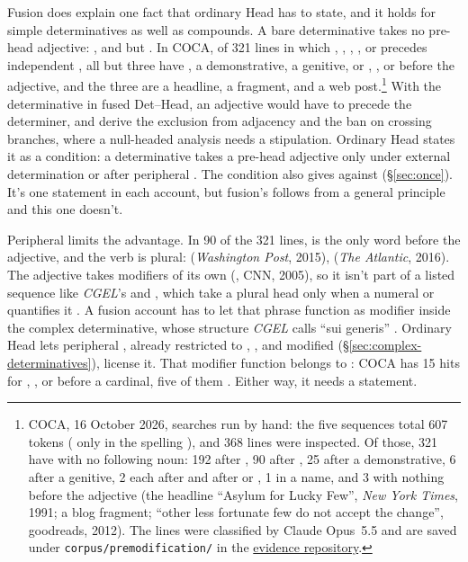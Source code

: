 \documentclass[12pt]{article}
\begin{document}
Fusion does explain one fact that ordinary Head has to state, and it holds for simple determinatives as well as compounds. A bare determinative takes no pre-head adjective: , and  but . In COCA, of 321 lines in which , , , , or  precedes independent , all but three have , a demonstrative, a genitive,  or , , or  before the adjective, and the three are a headline, a fragment, and a web post.\footnote{COCA, 16 October 2026, searches run by hand: the five sequences total 607 tokens ( only in the spelling ), and 368 lines were inspected. Of those, 321 have  with no following noun: 192 after , 90 after , 25 after a demonstrative, 6 after a genitive, 2 each after  and after  or , 1 in a name, and 3 with nothing before the adjective (the headline \enquote{Asylum for Lucky Few}, \textit{New York Times}, 1991; a blog fragment; \enquote{other less fortunate few do not accept the change}, goodreads, 2012). The lines were classified by Claude Opus~5.5 and are saved under \texttt{corpus/premodification/} in the \href{https://github.com/BrettRey/determinatives-as-nouns}{evidence repository}.} With the determinative in fused Det--Head, an adjective would have to precede the determiner, and \textcite[584]{Payne2007} derive the exclusion from adjacency and the ban on crossing branches, where a null-headed analysis needs a stipulation. Ordinary Head states it as a condition: a determinative takes a pre-head adjective only under external determination or after peripheral . The condition also gives  against  (§\ref{sec:once}). It's one statement in each account, but fusion's follows from a general principle and this one doesn't.

Peripheral  limits the advantage. In 90 of the 321 lines,  is the only word before the adjective, and the verb is plural:  (\textit{Washington Post}, 2015),  (\textit{The Atlantic}, 2016). The adjective takes modifiers of its own (, CNN, 2005), so it isn't part of a listed sequence like \textit{CGEL}'s  and , which take a plural head only when a numeral or  quantifies it \citep[353]{huddleston2002}. A fusion account has to let that phrase function as modifier inside the complex determinative, whose structure \textit{CGEL} calls \enquote{sui generis} \citep[394]{huddleston2002}. Ordinary Head lets peripheral , already restricted to , , and modified  (§\ref{sec:complex-determinatives}), license it. That modifier function belongs to : COCA has 15 hits for , , or  before a cardinal, five of them . Either way, it needs a statement.
\end{document}
